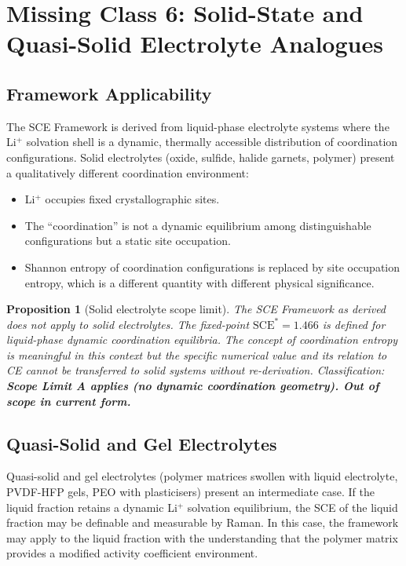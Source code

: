 \documentclass[11pt]{article}
\theoremstyle{plain}
\newtheorem{proposition}[theorem]{Proposition}
\theoremstyle{definition}
\theoremstyle{remark}
\begin{document}
\section{Missing Class 6: Solid-State and Quasi-Solid Electrolyte Analogues}
\label{sec:solid_state}

\subsection{Framework Applicability}

The SCE Framework is derived from liquid-phase electrolyte
systems where the Li$^+$ solvation shell is a dynamic,
thermally accessible distribution of coordination configurations.
Solid electrolytes (oxide, sulfide, halide garnets, polymer)
present a qualitatively different coordination environment:

\begin{itemize}[leftmargin=2em]
  \item Li$^+$ occupies fixed crystallographic sites.
  \item The ``coordination'' is not a dynamic equilibrium
        among distinguishable configurations but a static
        site occupation.
  \item Shannon entropy of coordination configurations is
        replaced by site occupation entropy, which is a
        different quantity with different physical significance.
\end{itemize}

\begin{proposition}[Solid electrolyte scope limit]
The SCE Framework as derived does not apply to solid
electrolytes.  The fixed-point $\mathrm{SCE}^{*} = 1.466$
is defined for liquid-phase dynamic coordination equilibria.
The concept of coordination entropy is meaningful in this
context but the specific numerical value and its relation
to CE cannot be transferred to solid systems without
re-derivation.  Classification: \textbf{Scope Limit A
applies (no dynamic coordination geometry).  Out of scope
in current form.}
\end{proposition}

\subsection{Quasi-Solid and Gel Electrolytes}

Quasi-solid and gel electrolytes (polymer matrices swollen
with liquid electrolyte, PVDF-HFP gels, PEO with plasticisers)
present an intermediate case.  If the liquid fraction retains
a dynamic Li$^+$ solvation equilibrium, the SCE of the
liquid fraction may be definable and measurable by Raman.
In this case, the framework may apply to the liquid fraction
with the understanding that the polymer matrix provides a
modified activity coefficient environment.
\end{document}
